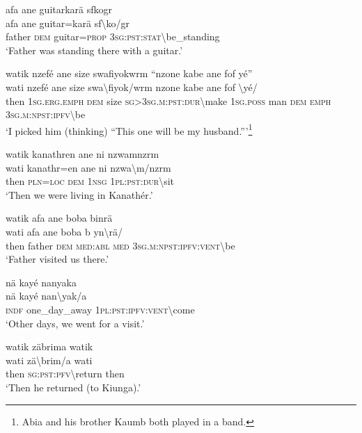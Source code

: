 \ea\label{ex:14:a3157}
afa ane guitarkarä sfkogr\\
\gll afa	ane	guitar=karä	sf{\textbackslash}ko/gr\\
     father	\textsc{dem}	guitar=\textsc{prop}	3\textsc{sg}:\textsc{pst}:\textsc{stat}{\textbackslash}be\_standing\\
\glt `Father was standing there with a guitar.'
\z

\ea\label{ex:14:a3158}
watik nzefé ane size swafiyokwrm ``nzone kabe ane fof yé''\\
\gll wati	nzefé	ane	size	swa{\textbackslash}fiyok/wrm	nzone	kabe	ane	fof	{\textbackslash}yé/\\
     then	1\textsc{sg}.\textsc{erg}.\textsc{emph}	\textsc{dem}	size	\textsc{sg}>3\textsc{sg}.\textsc{m}:\textsc{pst}:\textsc{dur}{\textbackslash}make	1\textsc{sg}.\textsc{poss}	man	\textsc{dem}	\textsc{emph}	3\textsc{sg}.\textsc{m}:\textsc{npst}:\textsc{ipfv}{\textbackslash}be\\
\glt `I picked him (thinking) ``This one will be my husband.'''\footnote{Abia and his brother Kaumb both played in a band.}
\z

\ea\label{ex:14:a3159}
watik kanathren ane ni nzwamnzrm\\
\gll wati	kanathr=en	ane	ni	nzwa{\textbackslash}m/nzrm\\
     then	\textsc{pln}=\textsc{loc}	\textsc{dem}	1\textsc{nsg}	1\textsc{pl}:\textsc{pst}:\textsc{dur}{\textbackslash}sit\\
\glt `Then we were living in Kanathér.'
\z

\ea\label{ex:14:a3161}
watik afa ane boba binrä\\
\gll wati	afa	ane	boba	b	yn{\textbackslash}rä/\\
     then	father	\textsc{dem}	\textsc{med}:\textsc{abl}	\textsc{med}	3\textsc{sg}.\textsc{m}:\textsc{npst}:\textsc{ipfv}:\textsc{vent}{\textbackslash}be\\
\glt `Father visited us there.'
\z

\ea\label{ex:14:a3162}
nä kayé nanyaka\\
\gll nä	kayé	nan{\textbackslash}yak/a\\
     \textsc{indf}	one\_day\_away	1\textsc{pl}:\textsc{pst}:\textsc{ipfv}:\textsc{vent}{\textbackslash}come\\
\glt `Other days, we went for a visit.'
\z

\ea\label{ex:14:a3163}
watik zäbrima watik\\
\gll wati	zä{\textbackslash}brim/a	wati\\
     then	\textsc{sg}:\textsc{pst}:\textsc{pfv}{\textbackslash}return	then\\
\glt `Then he returned (to Kiunga).'
\z

